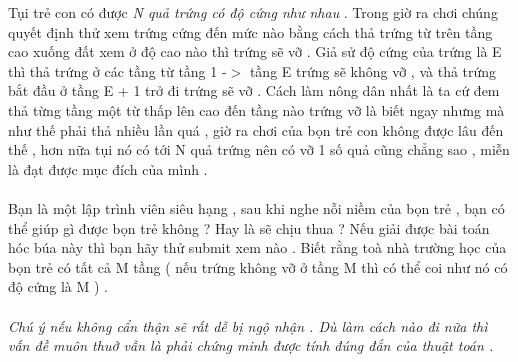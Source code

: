 Tụi trẻ con có được   \textit{    N quả trứng có độ cứng như nhau   }   . Trong giờ ra chơi chúng quyết định thử xem trứng cứng đến mức nào bằng cách thả trứng từ trên tầng cao xuống đất xem ở độ cao nào thì trứng sẽ vỡ . Giả sử độ cứng của trứng là E thì thả trứng ở các tầng từ tầng 1 -$>$ tầng E trứng sẽ không vỡ , và thả trứng bắt đầu ở tầng E + 1 trở đi trứng sẽ vỡ . Cách làm nông dân nhất là ta cứ đem thả từng tầng một từ thấp lên cao đến tầng nào trứng vỡ là biết ngay nhưng mà như thế phải thả nhiều lần quá , giờ ra chơi của bọn trẻ con không được lâu đến thế , hơn nữa tụi nó có tới N quả trứng nên có vỡ 1 số quả cũng chẳng sao , miễn là đạt được mục đích của mình .   
\\
\\   Bạn là một lập trình viên siêu hạng , sau khi nghe nỗi niềm của bọn trẻ , bạn có thể giúp gì được bọn trẻ không ? Hay là sẽ chịu thua ? Nếu giải được bài toán hóc búa này thì bạn hãy thử submit xem nào . Biết rằng toà nhà trường học của bọn trẻ có tất cả M tầng  ( nếu trứng không vỡ ở tầng M thì có thể coi như nó có độ cứng là M ) .   
\\
\\\textit{         Chú ý nếu không cẩn thận sẽ rất dễ bị ngộ nhận . Dù làm cách nào đi nữa thì vấn đề muôn thuở vẫn là phải chứng minh được tính đúng đắn của thuật toán .       }

\